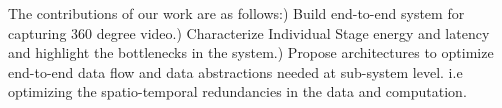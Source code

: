 The contributions of our work are as follows:) Build end-to-end system for capturing 360 degree video.) Characterize Individual Stage energy and latency and highlight the bottlenecks in the system.) Propose architectures to optimize end-to-end data flow and data abstractions needed at sub-system level. i.e optimizing the spatio-temporal redundancies in the data and computation.\newline





